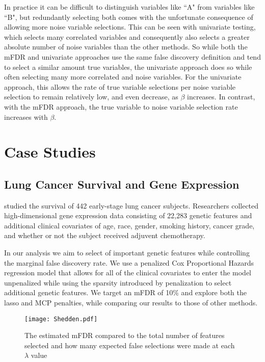 In practice it can be difficult to distinguish variables like ``A" from variables like ``B", but redundantly selecting both comes with the unfortunate consequence of allowing more noise variable selections. This can be seen with univariate testing, which selects many correlated variables and consequently also selects a greater absolute number of noise variables than the other methods. So while both the mFDR and univariate approaches use the same false discovery definition and tend to select a similar amount true variables, the univariate approach does so while often selecting many more correlated and noise variables. For the univariate approach, this allows the rate of true variable selections per noise variable selection to remain relatively low, and even decrease, as $\beta$ increases. In contrast, with the mFDR approach, the true variable to noise variable selection rate increases with $\beta$.  

\section{Case Studies}

\subsection{Lung Cancer Survival and Gene Expression}
\citet{Shedden2008} studied the survival of 442 early-stage lung cancer subjects. Researchers collected high-dimensional gene expression data consisting of 22,283 genetic features and additional clinical covariates of age, race, gender, smoking history, cancer grade, and whether or not the subject received adjuvent chemotherapy.  

In our analysis we aim to select of important genetic features while controlling the marginal false discovery rate.  We use a penalized Cox Proportional Hazards regression model that allows for all of the clinical covariates to enter the model unpenalized while using the sparsity introduced by penalization to select additional genetic features.  We target an mFDR of 10\% and explore both the lasso and MCP penalties, while comparing our results to those of other methods.

\begin{figure} [!htb]
 \centering
  \texttt{[image: Shedden.pdf]}
  \caption{\label{Fig:Shedden} The estimated mFDR compared to the total number of features selected and how many expected false selections were made at each $\lambda$ value}
\end{figure}

